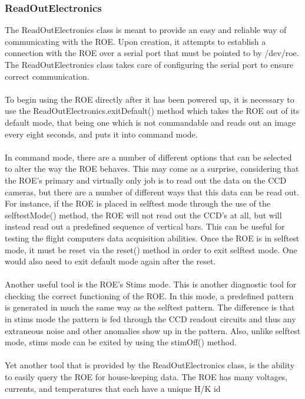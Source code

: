 \subsubsection{ReadOutElectronics}
The ReadOutElectronics class is meant to provide an easy and reliable way of 
communicating with the ROE. Upon creation, it attempts to establish a connection
with the ROE over a serial port that must be pointed to by /dev/roe. The ReadOutElectronics
class takes care of configuring the serial port to ensure correct communication.\\
\\
To begin using the ROE directly after it has been powered up, it is necessary to use the
ReadOutElectronics.exitDefault() method which takes the ROE out of its default mode, that being one
which is not commandable and reads out an image every eight seconds, and puts it into
command mode. \\
\\
In command mode, there are a number of different options that can be selected
to alter the way the ROE behaves. This may come as a surprise, considering that the ROE's
primary and virtually only job is to read out the data on the CCD cameras, but there are a number
of different ways that this data can be read out. For instance, if the ROE is placed in selftest mode
through the use of the selftestMode() method, the ROE will not read out the CCD's at all, but will
instead read out a predefined sequence of vertical bars. This can be useful for testing the flight
computers data acquisition abilities. Once the ROE is in selftest mode, it must be reset via the reset()
method in order to exit selftest mode. One would also need to exit default mode again after the reset.\\
\\
Another useful tool is the ROE's Stims mode. This is another diagnostic tool for checking the correct
functioning of the ROE. In this mode, a predefined pattern is generated in much the same way as the
selftest pattern. The difference is that in stims mode the pattern is fed through the CCD readout circuits
and thus any extraneous noise and other anomalies show up in the pattern. Also, unlike selftest mode, stims
mode can be exited by using the stimOff() method.\\
\\
Yet another tool that is provided by the ReadOutElectronics class, is the ability to easily query the ROE
for house-keeping data. The ROE has many voltages, currents, and temperatures that each have a unique H/K id
